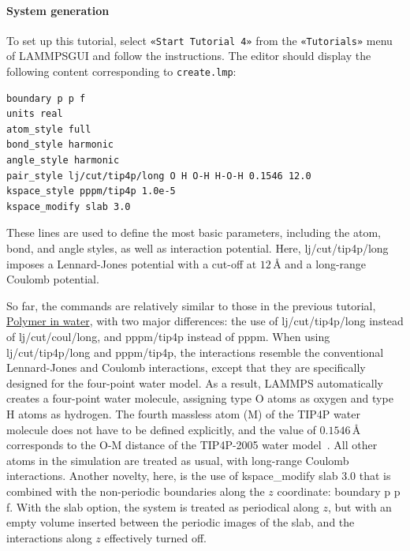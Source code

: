\documentclass[9pt,tutorial]{livecoms}
\newcommand{\lmpcmd}[1]{\hspace{0pt}\colorbox{listing}{\textcolor{command}{\small{#1}}}\hspace{0pt}} %
\newcommand{\flecmd}[1]{\textcolor{command}{\texttt{#1}}} %
\newcommand{\guicmd}[1]{\textcolor{command}{\texttt{«#1»}}} %
\newcommand{\lammpsgui}{\textsf{LAMMPS\textendash GUI}}
\begin{document}
\paragraph{System generation}

To set up this tutorial, select \guicmd{Start Tutorial 4} from the
\guicmd{Tutorials} menu of \lammpsgui{} and follow the instructions.
The editor should display the following content corresponding to \flecmd{create.lmp}:
\begin{lstlisting}
boundary p p f
units real
atom_style full
bond_style harmonic
angle_style harmonic
pair_style lj/cut/tip4p/long O H O-H H-O-H 0.1546 12.0
kspace_style pppm/tip4p 1.0e-5
kspace_modify slab 3.0
\end{lstlisting}
These lines are used to define the most basic parameters, including the
atom, bond, and angle styles, as well as interaction
potential.  Here, \lmpcmd{lj/cut/tip4p/long} imposes a Lennard-Jones potential with
a cut-off at $12\,\text{$\text{\AA{}}$}$ and a long-range Coulomb potential.

So far, the commands are relatively similar to those in the previous tutorial,
\hyperref[all-atom-label]{Polymer in water}, with two major differences: the use
of \lmpcmd{lj/cut/tip4p/long} instead of \lmpcmd{lj/cut/coul/long}, and \lmpcmd{pppm/tip4p}
instead of \lmpcmd{pppm}.  When using \lmpcmd{lj/cut/tip4p/long} and \lmpcmd{pppm/tip4p},
the interactions resemble the conventional Lennard-Jones and Coulomb interactions,
except that they are specifically designed for the four-point water model.  As a result,
LAMMPS automatically creates a four-point water molecule, assigning type O
atoms as oxygen and type H atoms as hydrogen.  The fourth massless atom (M) of the
TIP4P water molecule does not have to be defined explicitly, and the value of
$0.1546\,\text{$\text{\AA{}}$}$ corresponds to the O-M distance of the
TIP4P-2005 water model~\cite{abascal2005general}.  All other atoms in the simulation
are treated as usual, with long-range Coulomb interactions.  Another novelty, here, is
the use of \lmpcmd{kspace\_modify slab 3.0} that is combined with the non-periodic
boundaries along the $z$ coordinate: \lmpcmd{boundary p p f}.  With the \lmpcmd{slab}
option, the system is treated as periodical along $z$, but with an empty volume inserted
between the periodic images of the slab, and the interactions along $z$ effectively turned off.
\end{document}
